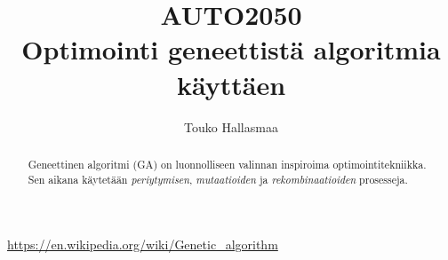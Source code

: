 \documentclass[12pt]{article}
\title{\normalsize\uppercase{auto2050}\\\Huge Optimointi geneettistä algoritmia käyttäen}
\author{Touko Hallasmaa}
\date{}
\begin{document}
\maketitle
\tableofcontents

\begin{abstract}
Geneettinen algoritmi (GA) on luonnolliseen valinnan inspiroima optimointitekniikka.
Sen aikana käytetään \textit{periytymisen}, \textit{mutaatioiden} ja \textit{rekombinaatioiden}
prosesseja.
\end{abstract}






\begin{thebibliography}{9}

	\url{https://en.wikipedia.org/wiki/Genetic_algorithm}

\end{thebibliography}
\end{document}

